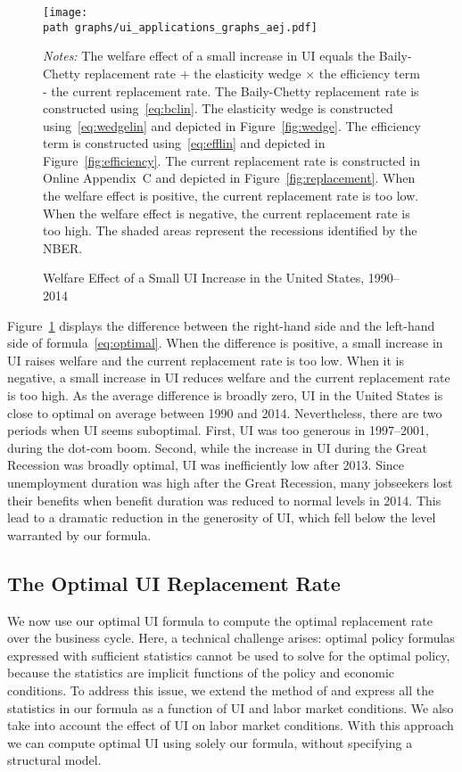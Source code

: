 \documentclass[letterpaper,12pt,leqno]{article}
\def\path{../}
\newcommand{\fignotes}[1]{\centering\parbox[c]{\textwidth}{\footnotesize \textit{Notes:} #1}}
\begin{document}
\begin{figure}[t] \centering
\texttt{[image: \\path graphs/ui\_applications\_graphs\_aej.pdf]}
\caption{Welfare Effect of a Small UI Increase in the United States, 1990--2014}
\fignotes{The welfare effect of a small increase in UI equals the Baily-Chetty replacement rate $+$ the elasticity wedge $\times$ the efficiency term  - the current replacement rate. The Baily-Chetty replacement rate is constructed using~\eqref{eq:bclin}. The elasticity wedge is constructed using~\eqref{eq:wedgelin} and depicted in Figure~\ref{fig:wedge}. The efficiency term is constructed using~\eqref{eq:efflin} and depicted in Figure~\ref{fig:efficiency}. The current replacement rate is constructed in Online Appendix~C and depicted in Figure~\ref{fig:replacement}. When the welfare effect is positive, the current replacement rate is too low. When the welfare effect is negative, the current replacement rate is too high. The shaded areas represent the recessions identified by the NBER.}
\label{fig:marginal}\end{figure}

Figure~\ref{fig:marginal} displays the difference between the right-hand side and the left-hand side of formula~\eqref{eq:optimal}. When the difference is positive, a small increase in UI raises welfare and the current replacement rate is too low. When it is negative, a small increase in UI reduces welfare and the current replacement rate is too high. As the average difference is broadly zero, UI in the United States is close to optimal on average between 1990 and 2014. Nevertheless, there are two periods when UI seems suboptimal. First,  UI was too generous in 1997--2001, during the dot-com boom. Second, while the increase in UI during the Great Recession was broadly optimal, UI was inefficiently low after 2013. Since unemployment duration was high after the Great Recession, many jobseekers lost their benefits when benefit duration was reduced to normal levels in 2014. This lead to a dramatic reduction in the generosity of UI, which fell below the level warranted by our formula.

\subsection{The Optimal UI Replacement Rate}

We now use our optimal UI formula to compute the optimal replacement rate over the business cycle. Here, a technical challenge arises: optimal policy formulas expressed with sufficient statistics cannot be used to solve for the optimal policy, because the statistics are implicit functions of the policy and economic conditions. To address this issue, we extend the method of \citet{G97} and express all the statistics in our formula as a function of UI and labor market conditions. We also take into account the effect of UI on labor market conditions. With this approach we can compute optimal UI using solely our formula, without specifying a structural model.
\end{document}
